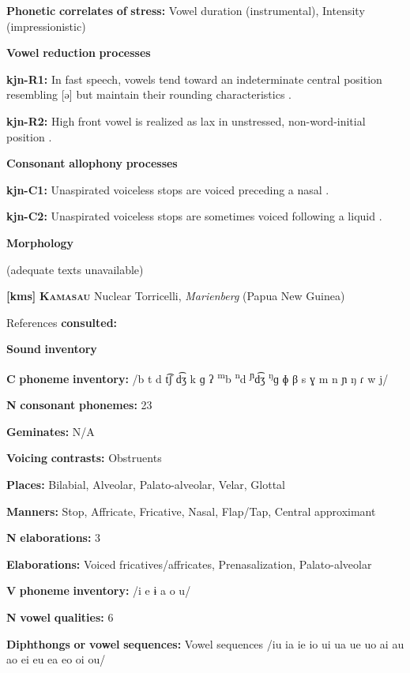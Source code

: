 \begin{styleBody}
\textbf{Phonetic} \textbf{correlates} \textbf{of} \textbf{stress:} Vowel duration (instrumental), Intensity (impressionistic)

\textbf{Vowel} \textbf{reduction} \textbf{processes}

\textbf{kjn-R1:} In fast speech, vowels tend toward an indeterminate central position resembling [ə] but maintain their rounding characteristics \citep[41]{Sommer1969}.

\textbf{kjn-R2:} High front vowel is realized as lax in unstressed, non-word-initial position \citep[41]{Sommer1969}.

\textbf{Consonant} \textbf{allophony} \textbf{processes}

\textbf{kjn-C1:} Unaspirated voiceless stops are voiced preceding a nasal \citep[39]{Sommer1969}.

\textbf{kjn-C2:} Unaspirated voiceless stops are sometimes voiced following a liquid \citep[39]{Sommer1969}.

\textbf{Morphology}

(adequate texts unavailable)

\textbf{[kms]}   \textbf{\textsc{Kamasau}}  Nuclear Torricelli, \textit{Marienberg} (Papua New Guinea)

References \textbf{consulted:} \citet{SandersSanders1980}

\textbf{Sound} \textbf{inventory}

\textbf{C} \textbf{phoneme} \textbf{inventory:} /b t d t͡ʃ d͡ʒ k ɡ ʔ \textsuperscript{m}b \textsuperscript{n}d \textsuperscript{ɲ}d͡ʒ \textsuperscript{ŋ}ɡ ɸ β s ɣ m n ɲ ŋ ɾ w j/

\textbf{N} \textbf{consonant} \textbf{phonemes:} 23

\textbf{Geminates:} N/A

\textbf{Voicing} \textbf{contrasts:} Obstruents

\textbf{Places:} Bilabial, Alveolar, Palato-alveolar, Velar, Glottal

\textbf{Manners:} Stop, Affricate, Fricative, Nasal, Flap/Tap, Central approximant

\textbf{N} \textbf{elaborations:} 3

\textbf{Elaborations:} Voiced fricatives/affricates, Prenasalization, Palato-alveolar

\textbf{V} \textbf{phoneme} \textbf{inventory:} /i e ɨ a o u/

\textbf{N} \textbf{vowel} \textbf{qualities:} 6

\textbf{Diphthongs} \textbf{or} \textbf{vowel} \textbf{sequences:} Vowel sequences /iu ia ie io ui ua ue uo ai au ao ei eu ea eo oi ou/


\end{styleBody}
